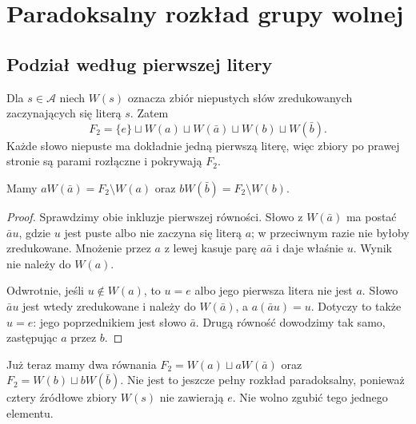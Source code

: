 \section{Paradoksalny rozkład grupy wolnej}
\subsection{Podział według pierwszej litery}
Dla $s\in\mathcal A$ niech $W(s)$ oznacza zbiór niepustych słów zredukowanych zaczynających się literą $s$. Zatem
\begin{equation}\label{eq:4-1}
 F_2=\{e\}\sqcup W(a)\sqcup W(\bar a)\sqcup W(b)\sqcup W(\bar b).
\end{equation}
Każde słowo niepuste ma dokładnie jedną pierwszą literę, więc zbiory po prawej stronie są parami rozłączne i pokrywają $F_2$.
\begin{lemat}\label{lem:pierwsza-litera}
Mamy $aW(\bar a)=F_2\setminus W(a)$ oraz $bW(\bar b)=F_2\setminus W(b)$.
\end{lemat}
\begin{proof}
Sprawdzimy obie inkluzje pierwszej równości. Słowo z $W(\bar a)$ ma postać $\bar au$, gdzie $u$ jest puste albo nie zaczyna się literą $a$; w przeciwnym razie nie byłoby zredukowane. Mnożenie przez $a$ z lewej kasuje parę $a\bar a$ i daje właśnie $u$. Wynik nie należy do $W(a)$.

Odwrotnie, jeśli $u\notin W(a)$, to $u=e$ albo jego pierwsza litera nie jest $a$. Słowo $\bar au$ jest wtedy zredukowane i należy do $W(\bar a)$, a $a(\bar au)=u$. Dotyczy to także $u=e$: jego poprzednikiem jest słowo $\bar a$. Drugą równość dowodzimy tak samo, zastępując $a$ przez $b$.
\end{proof}
Już teraz mamy dwa równania $F_2=W(a)\sqcup aW(\bar a)$ oraz $F_2=W(b)\sqcup bW(\bar b)$. Nie jest to jeszcze pełny rozkład paradoksalny, ponieważ cztery źródłowe zbiory $W(s)$ nie zawierają $e$. Nie wolno zgubić tego jednego elementu.


